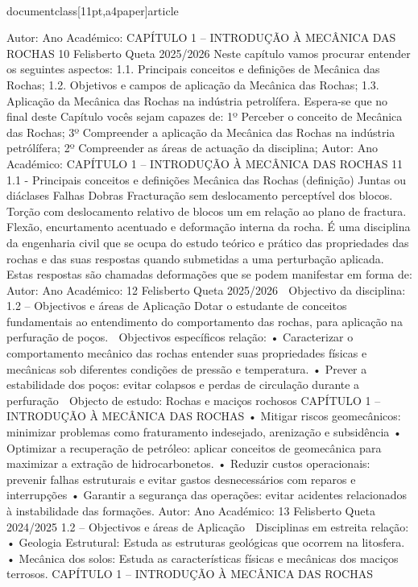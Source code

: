\\documentclass[11pt,a4paper]{article}
\begin{document}
Autor:
Ano Académico:
CAPÍTULO 1 
–
 INTRODUÇÃO À MECÂNICA DAS ROCHAS 10
Felisberto Queta
2025/2026
Neste capítulo vamos procurar entender os seguintes aspectos:
1.1. Principais conceitos e definições de Mecânica das Rochas;
1.2. Objetivos e campos de aplicação da Mecânica das Rochas;
1.3. Aplicação da Mecânica das Rochas na indústria petrolífera.
Espera-se que no final deste Capítulo vocês sejam capazes de:
1º Perceber o conceito de Mecânica das Rochas; 
3º Compreender a aplicação da Mecânica das Rochas na indústria petrólífera;
2º Compreender as áreas de actuação da disciplina;
Autor:
Ano Académico:
CAPÍTULO 1 
–
 INTRODUÇÃO À MECÂNICA DAS ROCHAS 11
1.1 - Principais conceitos e definições 
Mecânica das Rochas (definição)
Juntas ou diáclases Falhas Dobras
Fracturação sem 
deslocamento perceptível dos 
blocos.
Torção com deslocamento 
relativo de blocos um em 
relação ao plano de fractura.
Flexão,  encurtamento
acentuado e deformação
interna da rocha.
É uma disciplina da engenharia civil que se ocupa do estudo teórico e prático das propriedades das
rochas e das suas respostas quando submetidas a uma perturbação aplicada. Estas respostas são
chamadas deformações que se podem manifestar em forma de:
Autor:
Ano Académico:
12
Felisberto Queta
2025/2026
 Objectivo da disciplina:
1.2 – Objectivos e áreas de Aplicação
Dotar o estudante de conceitos fundamentais ao entendimento do comportamento das rochas, para aplicação na perfuração
de poços.
 Objectivos específicos relação:
• Caracterizar o comportamento
mecânico das rochas
entender suas propriedades físicas e mecânicas sob diferentes condições de
pressão e temperatura.
• Prever a estabilidade dos poços: evitar colapsos e perdas de circulação durante a perfuração
 Objecto de estudo:
Rochas e maciços rochosos
CAPÍTULO 1 
–
 INTRODUÇÃO À MECÂNICA DAS ROCHAS
• Mitigar riscos geomecânicos: minimizar problemas como fraturamento indesejado, arenização e subsidência
• Optimizar a recuperação de petróleo: aplicar conceitos de geomecânica para maximizar a extração de
hidrocarbonetos.
• Reduzir custos operacionais: prevenir falhas estruturais e evitar gastos desnecessários com reparos e
interrupções
• Garantir a segurança das operações: evitar acidentes relacionados à instabilidade das formações.
Autor:
Ano Académico:
13
Felisberto Queta
2024/2025
1.2 – Objectivos e áreas de Aplicação
 Disciplinas em estreita relação:
• Geologia Estrutural: Estuda as estruturas geológicas que ocorrem na litosfera.
• Mecânica dos solos: Estuda as características físicas e mecânicas dos maciços terrosos.
CAPÍTULO 1 
–
 INTRODUÇÃO À MECÂNICA DAS ROCHAS
\end{document}
